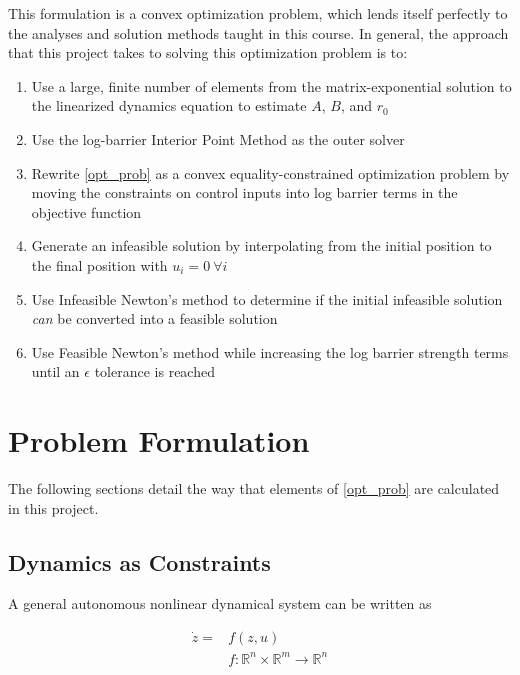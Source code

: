 \documentclass{exam}
\begin{document}
\begin{multicols*}{2}
This formulation is a convex optimization problem, which lends itself perfectly to the analyses and solution methods taught in this course. In general, the approach that this project takes to solving this optimization problem is to:

\begin{enumerate}
    \itemsep0em
    \item Use a large, finite number of elements from the matrix-exponential solution to the linearized dynamics equation to estimate $A$, $B$, and $r_0$
    \item Use the log-barrier Interior Point Method as the outer solver
    \item Rewrite \eqref{opt_prob} as a convex equality-constrained optimization problem by moving the constraints on control inputs into log barrier terms in the objective function
    \item Generate an infeasible solution by interpolating from the initial position to the final position with $u_i = 0 ~ \forall i$
    \item Use Infeasible Newton's method to determine if the initial infeasible solution \textit{can} be converted into a feasible solution
    \item Use Feasible Newton's method while increasing the log barrier strength terms until an $\epsilon$ tolerance is reached
\end{enumerate}

\section{Problem Formulation}

The following sections detail the way that elements of \eqref{opt_prob} are calculated in this project.

\subsection{Dynamics as Constraints}

A general autonomous nonlinear dynamical system can be written as

\begin{equation}
    \begin{aligned}
        \dot{z} = &f(z, u) \\
        &f : \mathbb{R}^n \times \mathbb{R}^m \rightarrow \mathbb{R}^n
    \end{aligned}
\end{equation}


\end{multicols*}
\end{document}
